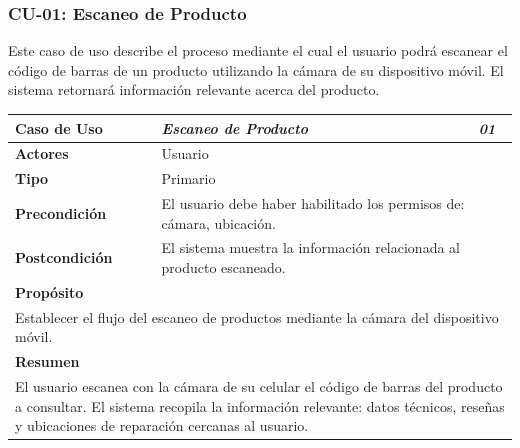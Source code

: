 \subsubsection{CU-01: Escaneo de Producto}
Este caso de uso describe el proceso mediante el cual el usuario podrá escanear
el código de barras de un producto utilizando la cámara de su dispositivo móvil.
El sistema retornará información relevante acerca del producto. \\

\begin{table}[H]
\centering
\begin{tabular}{p{3.5cm} p{10cm} p{1cm}}\toprule \textbf{Caso de Uso} &
\textit{Escaneo de Producto} & \textit{01} \\
\midrule
\textbf{Actores}       & Usuario   \\[6pt]
\textbf{Tipo}          & Primario  \\[6pt]
\textbf{Precondición}  & El usuario debe haber habilitado los permisos de:
cámara, ubicación. \\[6pt]
\textbf{Postcondición} & El sistema muestra la información relacionada al
producto escaneado. \\[6pt]
\midrule
\multicolumn{3}{l}{\textbf{Propósito}} \\[6pt]
\multicolumn{3}{p{14.5cm}}{Establecer el flujo del escaneo de productos mediante
la cámara del dispositivo móvil.} \\[6pt]
\midrule
\multicolumn{3}{l}{\textbf{Resumen}} \\[6pt]
\multicolumn{3}{p{14.5cm}}{El usuario escanea con la cámara de su celular el
código de barras del producto a consultar. El sistema recopila la información
relevante: datos técnicos, reseñas y ubicaciones
de reparación cercanas al usuario.} \\[6pt]
\bottomrule
\end{tabular}
\end{table}

